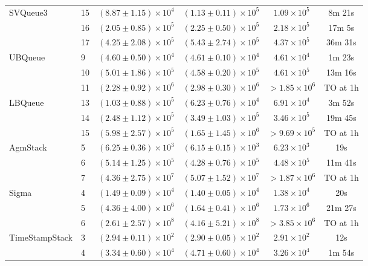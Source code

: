 \documentclass[acmsmall]{acmart}
\begin{document}
\begin{table}[tbp]
\begin{tabular}{llcccc}
\midrule
\multirow{3}{*}{SVQueue3}  & 15 & $(8.87 \pm 1.15) \times 10^{4}$ & $(1.13 \pm 0.11) \times 10^{5}$ & $1.09 \times 10^{5}$ & 8m 21s \\
 & 16 & $(2.05 \pm 0.85) \times 10^{5}$ & $(2.25 \pm 0.50) \times 10^{5}$ & $2.18 \times 10^{5}$ & 17m 5s \\
 & 17 & $(4.25 \pm 2.08) \times 10^{5}$ & $(5.43 \pm 2.74) \times 10^{5}$ & $4.37 \times 10^{5}$ & 36m 31s \\
\midrule
\multirow{3}{*}{UBQueue} & 9 & $(4.60 \pm 0.50) \times 10^{4}$ & $(4.61 \pm 0.10) \times 10^{4}$ & $4.61 \times 10^{4}$ & 1m 23s \\
 & 10 & $(5.01 \pm 1.86) \times 10^{5}$ & $(4.58 \pm 0.20) \times 10^{5}$ & $4.61 \times 10^{5}$ & 13m 16s \\
 & 11 & $(2.28 \pm 0.92) \times 10^{6}$ & $(2.98 \pm 0.30) \times 10^{6}$ & $>1.85 \times 10^{6}$ & TO at 1h  \\
 \midrule
 \multirow{3}{*}{LBQueue} & 13 & $(1.03 \pm 0.88) \times 10^{5}$ & $(6.23 \pm 0.76) \times 10^{4}$ & $6.91 \times 10^{4}$ & 3m 52s \\
 & 14 & $(2.48 \pm 1.12) \times 10^{5}$ & $(3.49 \pm 1.03) \times 10^{5}$ & $3.46 \times 10^{5}$ & 19m 45s \\
 & 15 & $(5.98 \pm 2.57) \times 10^{5}$ & $(1.65 \pm 1.45) \times 10^{6}$ & $>9.69 \times 10^{5}$ & TO at 1h  \\
 \midrule
\multirow{3}{*}{AgmStack} & 5 & $(6.25 \pm 0.36) \times 10^{3}$ & $(6.15 \pm 0.15) \times 10^{3}$ & $6.23 \times 10^{3}$ & 19s \\
 & 6 & $(5.14 \pm 1.25) \times 10^{5}$ & $(4.28 \pm 0.76) \times 10^{5}$ & $4.48 \times 10^{5}$ & 11m 41s \\
 & 7 & $(4.36 \pm 2.75) \times 10^{7}$ & $(5.07 \pm 1.52) \times 10^{7}$ & $>1.87 \times 10^{6}$ & TO at 1h  \\
 \midrule
\multirow{3}{*}{Sigma} & 4 & $(1.49 \pm 0.09) \times 10^{4}$ & $(1.40 \pm 0.05) \times 10^{4}$ & $1.38 \times 10^{4}$ & 20s \\
 & 5 & $(4.36 \pm 4.00) \times 10^{6}$ & $(1.64 \pm 0.41) \times 10^{6}$ & $1.73 \times 10^{6}$ & 21m 27s \\
 & 6 & $(2.61 \pm 2.57) \times 10^{8}$ & $(4.16 \pm 5.21) \times 10^{8}$ & $>3.85 \times 10^{6}$ & TO at 1h  \\
 \midrule
\multirow{3}{*}{TimeStampStack} & 3 & $(2.94 \pm 0.11) \times 10^{2}$ & $(2.90 \pm 0.05) \times 10^{2}$ & $2.91 \times 10^{2}$ & 12s \\
 & 4 & $(3.34 \pm 0.60) \times 10^{4}$ & $(4.71 \pm 0.60) \times 10^{4}$ & $3.26 \times 10^{4}$ & 1m 54s \\

\end{tabular}
\end{table}
\end{document}
